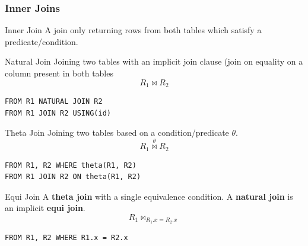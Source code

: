 \subsubsection{Inner Joins}
\begin{tcbraster}[raster columns=2, raster equal height]
    \begin{definitionbox}{Inner Join}
        A join only returning rows from both tables which satisfy a predicate/condition.
        \begin{center}
        \end{center}
    \end{definitionbox}
    \begin{definitionbox}{Natural Join}
        Joining two tables with an implicit join clause (join on equality on a column present in both tables
        \[R_1 \bowtie R_2\]
        \begin{verbatim}
FROM R1 NATURAL JOIN R2
FROM R1 JOIN R2 USING(id)
        \end{verbatim}
    \end{definitionbox}
\end{tcbraster}
\begin{tcbraster}[raster columns=2, raster equal height]
    \begin{definitionbox}{Theta Join}
        Joining two tables based on a condition/predicate $\theta$.
        \[R_1 \overset{\theta}{\bowtie} R_2\]
        \begin{verbatim}
FROM R1, R2 WHERE theta(R1, R2)
FROM R1 JOIN R2 ON theta(R1, R2)
        \end{verbatim}
    \end{definitionbox}
    \begin{definitionbox}{Equi Join}
        A \textbf{theta join} with a single equivalence condition. A \textbf{natural join} is an implicit \textbf{equi join}.
        \[R_1 \bowtie_{R_1.x = R_2.x}\]
        \begin{verbatim}
FROM R1, R2 WHERE R1.x = R2.x
        \end{verbatim}
    \end{definitionbox}
\end{tcbraster}
